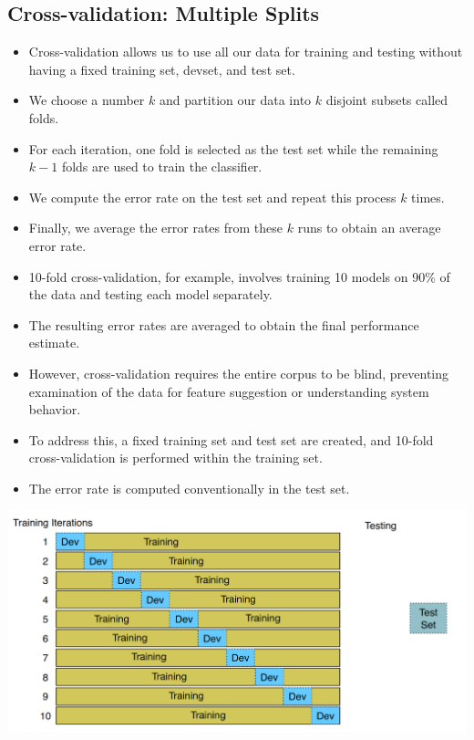 \documentclass{book}
\begin{document}
\subsection{Cross-validation: Multiple Splits}

\begin{itemize}
\item Cross-validation allows us to use all our data for training and testing without having a fixed training set, devset, and test set.
\item We choose a number $k$ and partition our data into $k$ disjoint subsets called folds.
\item For each iteration, one fold is selected as the test set while the remaining $k-1$ folds are used to train the classifier.
\item We compute the error rate on the test set and repeat this process $k$ times.
\item Finally, we average the error rates from these $k$ runs to obtain an average error rate.
\item 10-fold cross-validation, for example, involves training 10 models on 90\% of the data and testing each model separately.
\item The resulting error rates are averaged to obtain the final performance estimate.
\item However, cross-validation requires the entire corpus to be blind, preventing examination of the data for feature suggestion or understanding system behavior.
\item To address this, a fixed training set and test set are created, and 10-fold cross-validation is performed within the training set.
\item The error rate is computed conventionally in the test set.
\end{itemize}




\begin{center}
\includegraphics[scale=0.28]{pics/cv.png}
\end{center}
\end{document}
